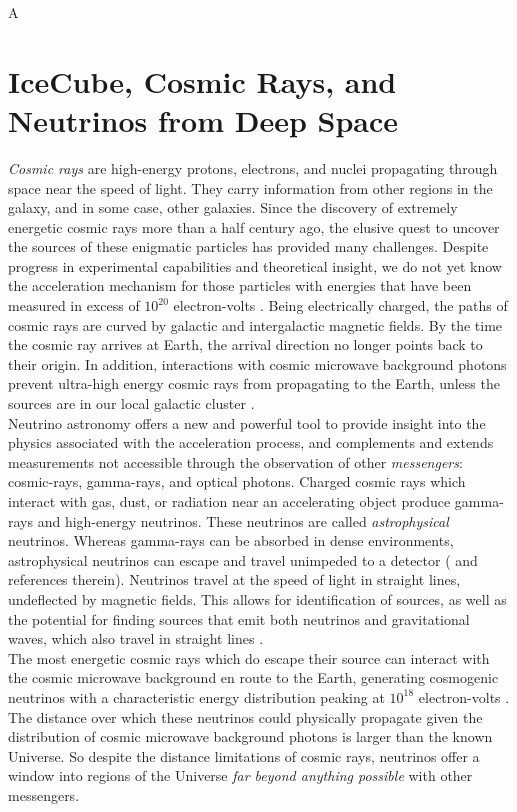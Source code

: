 \documentclass[../../../main.tex]{subfiles}
\begin{document}
A
\section{IceCube, Cosmic Rays, and Neutrinos from Deep Space}

\textit{Cosmic rays} are high-energy protons, electrons, and nuclei propagating through space near the speed of light.  They carry information from other regions in the galaxy, and in some case, other galaxies.  Since the discovery of extremely energetic cosmic rays more than a half century ago, the elusive quest to uncover the sources of these enigmatic particles has provided many challenges.  Despite progress in experimental capabilities and theoretical insight, we do not yet know the acceleration mechanism for those particles with energies that have been measured in excess of $10^{20}$ electron-volts \cite{10.1088/1742-6596/1766/1/012002}.  Being electrically charged, the paths of cosmic rays are curved by galactic and intergalactic magnetic fields.  By the time the cosmic ray arrives at Earth, the arrival direction no longer points back to their origin.  In addition, interactions with cosmic microwave background photons prevent ultra-high energy cosmic rays from propagating to the Earth, unless the sources are in our local galactic cluster \cite{PhysRevLett.16.748} \cite{1966JETPL...4...78Z}.
\\
\vspace{0.25cm}
Neutrino astronomy offers a new and powerful tool to provide insight into the physics associated with the acceleration process, and complements and extends measurements not accessible through the observation of other \textit{messengers}: cosmic-rays, gamma-rays, and  optical photons. Charged cosmic rays which interact with gas, dust, or radiation near an accelerating object produce gamma-rays and high-energy neutrinos.  These neutrinos are called \textit{astrophysical} neutrinos. Whereas gamma-rays can be absorbed in dense environments, astrophysical neutrinos can escape and travel unimpeded to a detector (\cite{Astro2020_1} and references therein). Neutrinos travel at the speed of light in straight lines, undeflected by magnetic fields.  This allows for identification of sources, as well as the potential for finding sources that emit both neutrinos and gravitational waves, which also travel in straight lines \cite{10.3847/2041-8213/ab9d24}.
\\
\vspace{0.25cm}
The most energetic cosmic rays which do escape their source can interact with the cosmic microwave background en route to the Earth, generating cosmogenic neutrinos with a characteristic energy distribution peaking at $10^{18}$ electron-volts \cite{10.1007/bf00645585} \cite{BERESINSKY1969423}. The distance over which these neutrinos could physically propagate given the distribution of cosmic microwave background photons is larger than the known Universe.  So despite the distance limitations of cosmic rays, neutrinos offer a window into regions of the Universe \textit{far beyond anything possible} with other messengers.
\end{document}
